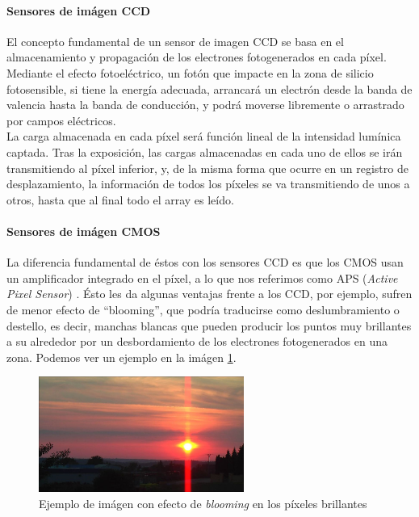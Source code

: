 \paragraph{Sensores de imágen CCD}
El concepto fundamental de un sensor de imagen CCD se basa en el almacenamiento
y propagación de los electrones fotogenerados en cada píxel. Mediante el efecto
fotoeléctrico, un fotón que impacte en la zona de silicio fotosensible, si tiene
la energía adecuada, arrancará un electrón desde la banda de valencia hasta la
banda de conducción, y podrá moverse libremente o arrastrado por campos eléctricos.\\

La carga almacenada en cada píxel será función lineal de la intensidad lumínica
captada. Tras la exposición, las cargas almacenadas en cada uno de ellos
se irán transmitiendo al píxel inferior, y, de la misma forma que ocurre en un
registro de desplazamiento, la información de todos los píxeles se va transmitiendo
de unos a otros, hasta que al final todo el array es leído.\cite{Nakamura2005}\\

\paragraph{Sensores de imágen CMOS}
La diferencia fundamental de éstos con los sensores CCD es que los CMOS usan un
amplificador integrado en el píxel, a lo que nos referimos como APS (\textit{Active Pixel Sensor})
\cite{Fossum1993}. Ésto les da algunas ventajas
frente a los CCD, por ejemplo, sufren de menor efecto de ``blooming'', que podría
traducirse como deslumbramiento o destello, es decir, manchas blancas que pueden
producir los puntos muy brillantes a su alrededor por un desbordamiento de los
electrones fotogenerados en una zona. Podemos ver un ejemplo en la
imágen \ref{fig:blooming}.\\

\begin{figure}[h]
	\centering
	\includegraphics[width=0.6\textwidth]{img/blooming.jpg}
	\caption{Ejemplo de imágen con efecto de \textit{blooming} en los píxeles brillantes
	\protect\footnotemark}
	\label{fig:blooming}
\end{figure}

